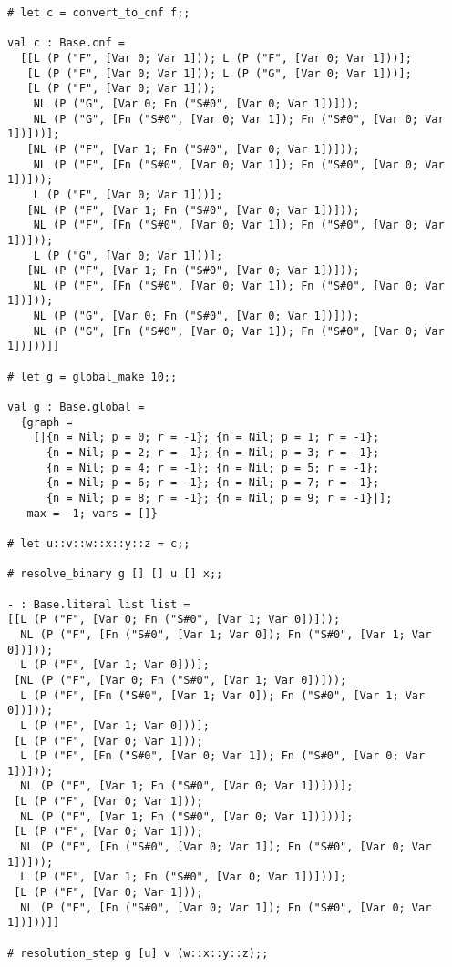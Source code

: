 \documentclass[a4paper]{article}
\begin{document}
\begin{lstlisting}[name=interp]
# let c = convert_to_cnf f;;

val c : Base.cnf =
  [[L (P ("F", [Var 0; Var 1])); L (P ("F", [Var 0; Var 1]))];
   [L (P ("F", [Var 0; Var 1])); L (P ("G", [Var 0; Var 1]))];
   [L (P ("F", [Var 0; Var 1]));
    NL (P ("G", [Var 0; Fn ("S#0", [Var 0; Var 1])]));
    NL (P ("G", [Fn ("S#0", [Var 0; Var 1]); Fn ("S#0", [Var 0; Var 1])]))];
   [NL (P ("F", [Var 1; Fn ("S#0", [Var 0; Var 1])]));
    NL (P ("F", [Fn ("S#0", [Var 0; Var 1]); Fn ("S#0", [Var 0; Var 1])]));
    L (P ("F", [Var 0; Var 1]))];
   [NL (P ("F", [Var 1; Fn ("S#0", [Var 0; Var 1])]));
    NL (P ("F", [Fn ("S#0", [Var 0; Var 1]); Fn ("S#0", [Var 0; Var 1])]));
    L (P ("G", [Var 0; Var 1]))];
   [NL (P ("F", [Var 1; Fn ("S#0", [Var 0; Var 1])]));
    NL (P ("F", [Fn ("S#0", [Var 0; Var 1]); Fn ("S#0", [Var 0; Var 1])]));
    NL (P ("G", [Var 0; Fn ("S#0", [Var 0; Var 1])]));
    NL (P ("G", [Fn ("S#0", [Var 0; Var 1]); Fn ("S#0", [Var 0; Var 1])]))]]

# let g = global_make 10;;

val g : Base.global =
  {graph =
    [|{n = Nil; p = 0; r = -1}; {n = Nil; p = 1; r = -1};
      {n = Nil; p = 2; r = -1}; {n = Nil; p = 3; r = -1};
      {n = Nil; p = 4; r = -1}; {n = Nil; p = 5; r = -1};
      {n = Nil; p = 6; r = -1}; {n = Nil; p = 7; r = -1};
      {n = Nil; p = 8; r = -1}; {n = Nil; p = 9; r = -1}|];
   max = -1; vars = []}

# let u::v::w::x::y::z = c;;

# resolve_binary g [] [] u [] x;;

- : Base.literal list list =
[[L (P ("F", [Var 0; Fn ("S#0", [Var 1; Var 0])]));
  NL (P ("F", [Fn ("S#0", [Var 1; Var 0]); Fn ("S#0", [Var 1; Var 0])]));
  L (P ("F", [Var 1; Var 0]))];
 [NL (P ("F", [Var 0; Fn ("S#0", [Var 1; Var 0])]));
  L (P ("F", [Fn ("S#0", [Var 1; Var 0]); Fn ("S#0", [Var 1; Var 0])]));
  L (P ("F", [Var 1; Var 0]))];
 [L (P ("F", [Var 0; Var 1]));
  L (P ("F", [Fn ("S#0", [Var 0; Var 1]); Fn ("S#0", [Var 0; Var 1])]));
  NL (P ("F", [Var 1; Fn ("S#0", [Var 0; Var 1])]))];
 [L (P ("F", [Var 0; Var 1]));
  NL (P ("F", [Var 1; Fn ("S#0", [Var 0; Var 1])]))];
 [L (P ("F", [Var 0; Var 1]));
  NL (P ("F", [Fn ("S#0", [Var 0; Var 1]); Fn ("S#0", [Var 0; Var 1])]));
  L (P ("F", [Var 1; Fn ("S#0", [Var 0; Var 1])]))];
 [L (P ("F", [Var 0; Var 1]));
  NL (P ("F", [Fn ("S#0", [Var 0; Var 1]); Fn ("S#0", [Var 0; Var 1])]))]]

# resolution_step g [u] v (w::x::y::z);;


\end{lstlisting}
\end{document}
